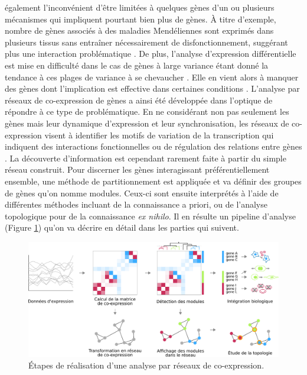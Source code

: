également l'inconvénient d'être limitées à quelques gènes d'un ou plusieurs mécanismes qui impliquent pourtant bien plus de gènes. À titre d'exemple, nombre de gènes associés à des maladies Mendéliennes sont exprimés dans plusieurs tissus sans entraîner nécessairement de disfonctionnement, suggérant plus une interaction problématique \cite{Hekselman2020Mar}. De plus, l'analyse d'expression différentielle est mise en difficulté dans le cas de gènes à large variance étant donné la tendance à ces plages de variance à se chevaucher \cite{Ostlund2014}. Elle en vient alors à manquer des gènes dont l'implication est effective dans certaines conditions \cite{delaFuente2010Jul}. L'analyse par réseaux de co-expression de gènes a ainsi été développée dans l'optique de répondre à ce type de problématique. En ne considérant non pas seulement les gènes mais leur dynamique d'expression et leur synchronisation, les réseaux de co-expression visent à identifier les motifs de variation de la transcription qui indiquent des interactions fonctionnelles ou de régulation des relations entre gènes \cite{Parsana2019}. La découverte d'information est cependant rarement faite à partir du simple réseau construit. Pour discerner les gènes interagissant préférentiellement ensemble, une méthode de partitionnement est appliquée et va définir des groupes de gènes qu'on nomme \glspl{module}. Ceux-ci sont ensuite interprétés à l'aide de différentes méthodes incluant de la connaissance a priori, ou de l'analyse topologique pour de la connaissance \textit{ex nihilo}. Il en résulte un pipeline d'analyse (Figure \ref{fig:coexpr_pipeline}) qu'on va décrire en détail dans les parties qui suivent.


\begin{figure}[h!]
    \centering
    \includegraphics[width=\textwidth]{img/intro/3_coexpr/intro_3_coexpr_principle.pdf}
    \caption[Étapes de réalisation d'une analyse par réseaux de co-expression.]{Étapes de réalisation d'une analyse par réseaux de co-expression.}
    \label{fig:coexpr_pipeline}
\end{figure}



